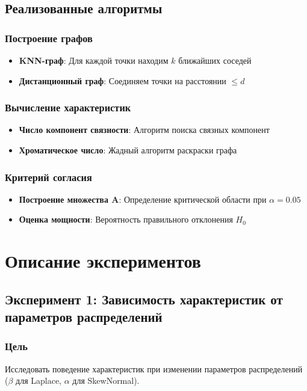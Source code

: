 \documentclass[a4paper, 12pt]{article}
\begin{document}
\subsection{Реализованные алгоритмы}
\subsubsection{Построение графов}
\begin{itemize}
    \item \textbf{KNN-граф}: Для каждой точки находим $k$ ближайших соседей
    \item \textbf{Дистанционный граф}: Соединяем точки на расстоянии $\leq d$
\end{itemize}

\subsubsection{Вычисление характеристик}
\begin{itemize}
    \item \textbf{Число компонент связности}: Алгоритм поиска связных компонент
    \item \textbf{Хроматическое число}: Жадный алгоритм раскраски графа
\end{itemize}

\subsubsection{Критерий согласия}
\begin{itemize}
    \item \textbf{Построение множества A}: Определение критической области при $\alpha=0.05$
    \item \textbf{Оценка мощности}: Вероятность правильного отклонения $H_0$
\end{itemize}

\section{Описание экспериментов}
\subsection{Эксперимент 1: Зависимость характеристик от параметров распределений}
\subsubsection{Цель}
Исследовать поведение характеристик при изменении параметров распределений ($\beta$ для Laplace, $\alpha$ для SkewNormal).
\end{document}
